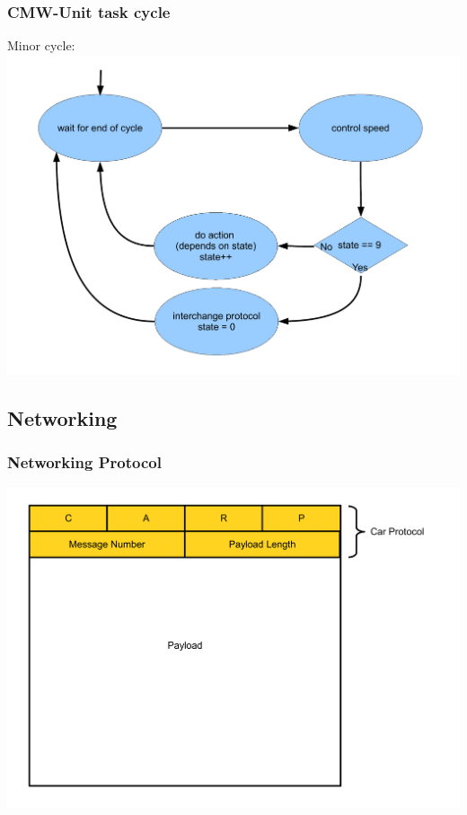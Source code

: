 \documentclass{beamer}
\begin{document}
\begin{frame}
	\frametitle{CMW-Unit task cycle}
	Minor cycle:\\
	\includegraphics[scale=0.35]{figures/cycle.pdf}
\end{frame}


\subsection{Networking}

\begin{frame}
	\frametitle{Networking Protocol}
	\includegraphics[scale=0.35]{figures/prot0.pdf}
\end{frame}
\end{document}
